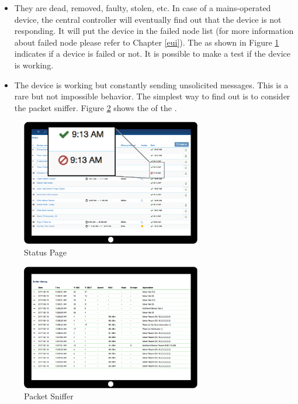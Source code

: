 \begin{itemize}
\item They are dead, removed, faulty, stolen, etc. In case of a mains-operated device, 
the central \zway controller  will eventually find out that the device is not responding. 
It will put the device in the failed node list (for more information about failed node 
please refer to Chapter \ref{eui}). The  as shown in 
Figure \ref{c5:citstatus} indicates if a device is failed or not.
It is possible to make a test if the device is working.
\item The device is working but constantly sending unsolicited messages. This is a rare 
but not impossible behavior. The simplest way to find out is to consider the packet 
sniffer. Figure \ref{c5:snifferpak} shows the  of the \zweui.
\end{itemize}

\begin{figure}
\begin{center}
\includegraphics[width=0.7\textwidth]{pngs/cap8/c5networkstatus.pdf}
\caption{Status Page \zway}

\label{c5:citstatus}
\end{center}
\end{figure}


\begin{figure}
\begin{center}
\includegraphics[width=0.7\textwidth]{pngs/cap8/c5sniffer.pdf}
\caption{Packet Sniffer}
\label{c5:snifferpak}
\end{center}
\end{figure}

